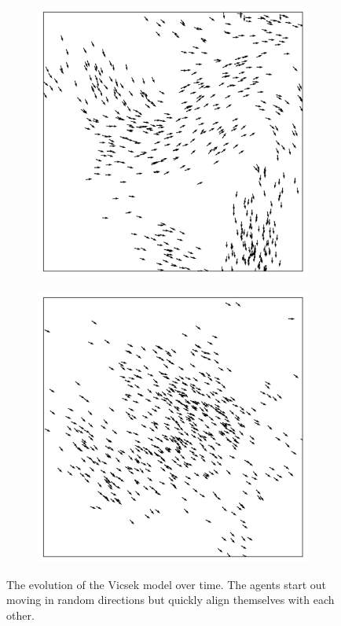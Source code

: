 \documentclass[%
11pt,
amsmath, amssymb,
aps,
pra
]{revtex4-2}
\newcommand{\threeImageSpacing}{0.25\textwidth}
\begin{document}
\begin{figure}[t]
\begin{subfigure}{\threeImageSpacing}
        \includegraphics[width=\linewidth]{images/vicsek/Vicsek.png}
    \end{subfigure}
    \begin{subfigure}{\threeImageSpacing}
        \includegraphics[width=\linewidth]{images/vicsek/VicsekLater.png}
    \end{subfigure}
    \caption{The evolution of the Vicsek model over time. 
    The agents start out moving in random directions but quickly align themselves with each other.}
    \label{fig:VicsekTimeEvolution}
\end{figure}
\end{document}
